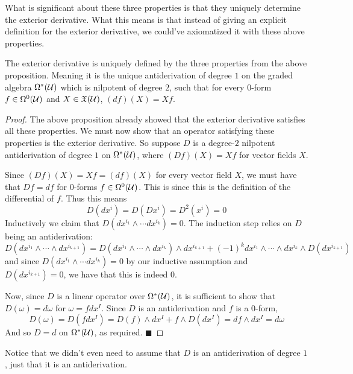 \documentclass[10pt]{article}
\def\mU{{\cal U}}
\def\fX{\mathfrak{X}}
\def\qed{%
    \ifmmode%
        \eqno\blacksquare%
    \else%
        \hskip1cm\allowbreak\hbox{}\nobreak\hfill$\blacksquare$%
    \fi%
}
\begin{document}
What is significant about these three properties is that they uniquely determine the exterior derivative.
What this means is that instead of giving an explicit definition for the exterior derivative, we could've axiomatized it with these above properties.

\begin{thrm*}

    The exterior derivative is uniquely defined by the three properties from the above proposition.
    Meaning it is the unique antiderivation of degree $1$ on the graded algebra $\Omega^*(\mU)$ which is nilpotent of degree $2$, such that for every $0$-form $f\in\Omega^0(\mU)$ and $X\in\fX(\mU)$,
    $(df)(X)=Xf$.

\end{thrm*}

\begin{proof}

    The above proposition already showed that the exterior derivative satisfies all these properties.
    We must now show that an operator satisfying these properties is the exterior derivative.
    So suppose $D$ is a degree-$2$ nilpotent antiderivation of degree $1$ on $\Omega^*(\mU)$, where $(Df)(X)=Xf$ for vector fields $X$.
    
    Since $(Df)(X)=Xf=(df)(X)$ for every vector field $X$, we must have that $Df=df$ for $0$-forms $f\in\Omega^0(\mU)$.
    This is since this is the definition of the differential of $f$.
    Thus this means
    \[ D(dx^i) = D(Dx^i) = D^2(x^i) = 0 \]
    Inductively we claim that $D(dx^{i_1}\wedge\cdots dx^{i_k})=0$.
    The induction step relies on $D$ being an antiderivation:
    \[ D(dx^{i_1}\wedge\cdots\wedge dx^{i_{k+1}}) = D(dx^{i_1}\wedge\cdots\wedge dx^{i_k})\wedge dx^{i_{k+1}} + (-1)^kdx^{i_1}\wedge\cdots\wedge dx^{i_k}\wedge D(dx^{i_{k+1}}) \]
    and since $D(dx^{i_1}\wedge\cdots dx^{i_k})=0$ by our inductive assumption and $D(dx^{i_{k+1}})=0$, we have that this is indeed $0$.

    Now, since $D$ is a linear operator over $\Omega^*(\mU)$, it is sufficient to show that $D(\omega)=d\omega$ for $\omega=fdx^I$.
    Since $D$ is an antiderivation and $f$ is a $0$-form,
    \[ D(\omega) = D(fdx^I) = D(f)\wedge dx^I + f\wedge D(dx^I) = df\wedge dx^I = d\omega \]
    And so $D=d$ on $\Omega^*(\mU)$, as required.
    \qed

\end{proof}

Notice that we didn't even need to assume that $D$ is an antiderivation of degree $1$, just that it is an antiderivation.
\end{document}

